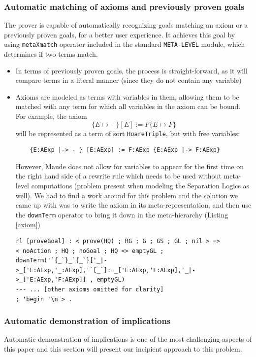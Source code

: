 \documentclass[12pt,a4paper]{article}
\begin{document}
{\subsubsection{Automatic matching of axioms and previously proven goals}
The prover is capable of automatically recognizing goals matching an axiom or a previously proven goals, for a better user experience.
It achieves this goal by using \texttt{metaXmatch} operator included in the standard \texttt{META-LEVEL} module, which determines if two terms match. 
\begin{itemize}
	\item In terms of previously proven goals, the process is straight-forward, as it will compare terms in a literal manner (since they do not contain any variable)
	\item Axioms are modeled as terms with variables in them, allowing them to be matched with any term for which all variables in the axiom can be bound.
	For example, the axiom 
	\[
		\{E \mapsto -\} [E] := F \{E \mapsto F\}
	\]
	will be represented as a term of sort \texttt{HoareTriple}, but with free variables:
	\begin{lstlisting}
	{E:AExp |-> - } [E:AExp] := F:AExp {E:AExp |-> F:AExp}\end{lstlisting}
	
	
	However, Maude does not allow for variables to appear for the first time on the right hand side of a rewrite rule which needs to be used without meta-level computations (problem present when modeling the Separation Logics as well). We had to find a work around for this problem and the solution we came up with was to write the axiom in its meta-representation, and then use the \texttt{downTerm} operator to bring it down in the meta-hierarchy (Listing \ref{axiom})
	
	\begin{lstlisting}[label=axiom,caption=Initialization of Prover state]
rl [proveGoal] : < prove(HQ) ; RG ; G ; GS ; GL ; nil > =>
< noAction ; HQ ; noGoal ; HQ <> emptyGL ; 
downTerm('`{_`}_`{_`}['_|->_['E:AExp,'_:AExp],'`[_`]:=_['E:AExp,'F:AExp],'_|->_['E:AExp,'F:AExp]] , emptyGL)
--- ... [other axioms omitted for clarity] 
; 'begin '\n > .\end{lstlisting}
\end{itemize}
\subsubsection{Automatic demonstration of implications}
Automatic demonstration of implications is one of the most challenging aspects of this paper and this section will present our incipient approach to this problem.

}
\end{document}
